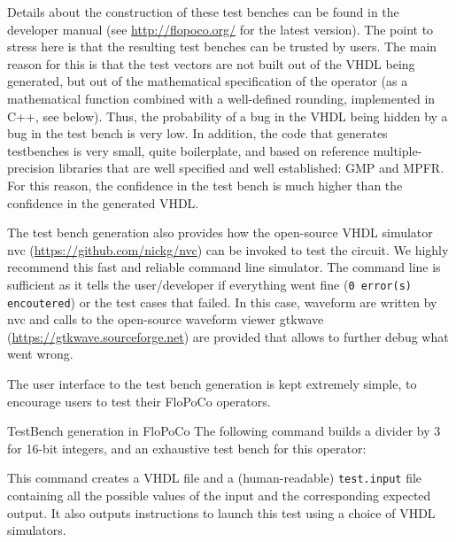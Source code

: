 \documentclass{article}
\begin{document}
Details about the construction of these test benches can be found in the developer manual (see \url{http://flopoco.org/} for the latest version).
The point  to stress here is that the resulting test benches can be trusted by users.
The main reason for this is that the test vectors are not built out of the VHDL being generated, but out of the mathematical specification of the operator (as a mathematical function combined with a well-defined rounding, implemented in C++, see  below).
Thus, the probability of a bug in the VHDL being hidden by a bug in the test bench is very low.
In addition,  the code that generates testbenches is very small, quite boilerplate, and based on reference multiple-precision libraries that are well specified and well established: {GMP} and {MPFR}.
For this reason, the confidence in the test bench is much higher than the confidence in the generated VHDL.

The test bench generation also provides how the open-source VHDL simulator nvc (\url{https://github.com/nickg/nvc}) can be invoked to test the circuit. 
We highly recommend this fast and reliable command line simulator.
The command line is sufficient as it tells the user/developer if everything went fine (\texttt{0 error(s) encoutered}) or the test cases that failed.
In this case, waveform are written by nvc and calls to the open-source waveform viewer gtkwave (\url{https://gtkwave.sourceforge.net}) are provided that allows to further debug what went wrong.

The user interface to the test bench generation is kept extremely simple, to encourage users to test their FloPoCo operators.

\begin{flopocobox}{TestBench generation in FloPoCo}
  The following command builds a divider by 3 for 16-bit integers, and an exhaustive test bench for this operator:
 

  This command creates a VHDL file and a (human-readable) \texttt{test.input} file containing all the possible values of the input and the corresponding expected output.
  It also outputs instructions to launch this test using a choice of VHDL simulators.
\end{flopocobox}
\end{document}
